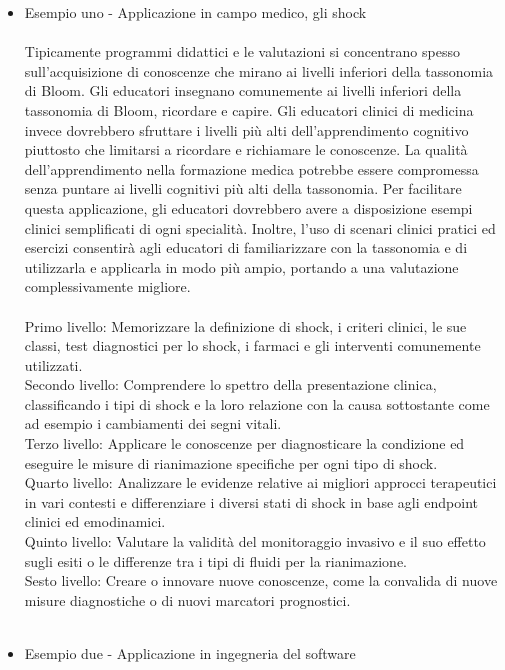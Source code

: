 \begin{itemize}
\item Esempio uno - Applicazione in campo medico, gli shock\\
\\
Tipicamente programmi didattici e le valutazioni si concentrano spesso sull'acquisizione di conoscenze che mirano ai livelli inferiori della tassonomia di Bloom. Gli educatori insegnano comunemente ai livelli inferiori della tassonomia di Bloom, ricordare e capire. Gli educatori clinici di medicina invece dovrebbero sfruttare i livelli più alti dell'apprendimento cognitivo piuttosto che limitarsi a ricordare e richiamare le conoscenze. La qualità dell'apprendimento nella formazione medica potrebbe essere compromessa senza puntare ai livelli cognitivi più alti della tassonomia. Per facilitare questa applicazione, gli educatori dovrebbero avere a disposizione esempi clinici semplificati di ogni specialità. Inoltre, l'uso di scenari clinici pratici ed esercizi consentirà agli educatori di familiarizzare con la tassonomia e di utilizzarla e applicarla in modo più ampio, portando a una valutazione complessivamente migliore.\\
  \\
Primo livello: Memorizzare la definizione di shock, i criteri clinici, le sue classi, test diagnostici per lo shock, i farmaci e gli interventi comunemente utilizzati. \\
Secondo livello: Comprendere lo spettro della presentazione clinica, classificando i tipi di shock e la loro relazione con la causa sottostante come ad esempio i cambiamenti dei segni vitali.\\
Terzo livello: Applicare le conoscenze per diagnosticare la condizione ed eseguire le misure di rianimazione specifiche per ogni tipo di shock.\\
Quarto livello: Analizzare le evidenze relative ai migliori approcci terapeutici in vari contesti e differenziare i diversi stati di shock in base agli endpoint clinici ed emodinamici.\\
Quinto livello: Valutare la validità del monitoraggio invasivo e il suo effetto sugli esiti o le differenze tra i tipi di fluidi per la rianimazione.\\
Sesto livello: Creare o innovare nuove conoscenze, come la convalida di nuove misure diagnostiche o di nuovi marcatori prognostici.\\
\\
\item Esempio due - Applicazione in ingegneria del software\\

\end{itemize}
